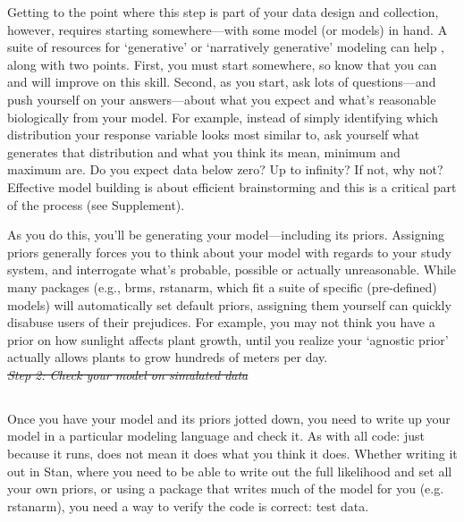 \documentclass[11pt]{article}
\providecommand{\DIFaddtex}[1]{{\protect\color{blue}\uwave{#1}}} %
\providecommand{\DIFdeltex}[1]{{\protect\color{red}\sout{#1}}}                      %
\providecommand{\DIFaddbegin}{} %
\providecommand{\DIFaddend}{} %
\providecommand{\DIFdelbegin}{} %
\providecommand{\DIFdelend}{} %
\providecommand{\DIFadd}[1]{\texorpdfstring{\DIFaddtex{#1}}{#1}} %
\providecommand{\DIFdel}[1]{\texorpdfstring{\DIFdeltex{#1}}{}} %
\newcommand{\DIFscaledelfig}{0.5}
\newlength{\DIFdelgraphicswidth} %
\newlength{\DIFdelgraphicsheight} %
\newcommand{\DIFaddincludegraphics}[2][]{{\color{blue}\fbox{\DIFOincludegraphics[#1]{#2}}}} %
\newcommand{\DIFdelincludegraphics}[2][]{%
\sbox{\DIFdelgraphicsbox}{\DIFOincludegraphics[#1]{#2}}%
\settoboxwidth{\DIFdelgraphicswidth}{\DIFdelgraphicsbox} %
\settoboxtotalheight{\DIFdelgraphicsheight}{\DIFdelgraphicsbox} %
\scalebox{\DIFscaledelfig}{%
\parbox[b]{\DIFdelgraphicswidth}{\usebox{\DIFdelgraphicsbox}\\[-\baselineskip] \rule{\DIFdelgraphicswidth}{0em}}\llap{\resizebox{\DIFdelgraphicswidth}{\DIFdelgraphicsheight}{%
\setlength{\unitlength}{\DIFdelgraphicswidth}%
\begin{picture}(1,1)%
\thicklines\linethickness{2pt} %
{\color[rgb]{1,0,0}\put(0,0){\framebox(1,1){}}}%
{\color[rgb]{1,0,0}\put(0,0){\line( 1,1){1}}}%
{\color[rgb]{1,0,0}\put(0,1){\line(1,-1){1}}}%
\end{picture}%
}\hspace*{3pt}}} %
} %
\DeclareRobustCommand{\DIFaddbegin}{\DIFOaddbegin \let\includegraphics\DIFaddincludegraphics} %
\DeclareRobustCommand{\DIFaddend}{\DIFOaddend \let\includegraphics\DIFOincludegraphics} %
\DeclareRobustCommand{\DIFdelbegin}{\DIFOdelbegin \let\includegraphics\DIFdelincludegraphics} %
\DeclareRobustCommand{\DIFdelend}{\DIFOaddend \let\includegraphics\DIFOincludegraphics} %
\begin{document}
Getting to the point where this step is part of your data design and collection, however, requires starting somewhere---with some model (or models) in hand. A suite of resources for `generative' or `narratively generative' modeling can help \citep{statrethink,betangen}, along with two points. First, you must start somewhere, so know that you can and will improve on this skill. Second, as you start, ask lots of questions---and push yourself on your answers---about what you expect and what's reasonable biologically from your model. For example, instead of simply identifying which distribution your response variable looks most similar to, ask yourself what generates that distribution and what you think its mean, minimum and maximum are. Do you expect data below zero? Up to infinity? If not, why not? Effective model building is about efficient brainstorming and this is a critical part of the process (see Supplement). 

As you do this, you'll be generating your model---including its priors. Assigning priors generally forces you to think about your model with regards to your study system, and interrogate what's probable, possible or actually unreasonable. While many packages (e.g., \textsf{brms, rstanarm}, which fit a suite of specific (pre-defined) models) will automatically set default priors, assigning them yourself can quickly disabuse users of their prejudices. For example, you may not think you have a prior on how sunlight affects plant growth, until you realize your `agnostic prior' actually allows plants to grow hundreds of meters per day. \\%

\DIFdelbegin \emph{\DIFdel{Step 2: Check your model on simulated data}} 
\DIFdelend \DIFaddbegin \subsection{\DIFadd{Step 2: Check your model on simulated data}} 
\DIFaddend 

Once you have your model and its priors jotted down, you need to write up your model in a particular modeling language and check it. As with all code: just because it runs, does not mean it does what you think it does. Whether writing it out in \textsf{Stan}, where you need to be able to write out the full likelihood and set all your own priors, or using a package that writes much of the model for you (e.g. \textsf{rstanarm}), you need a way to verify the code is correct: test data.
\end{document}
